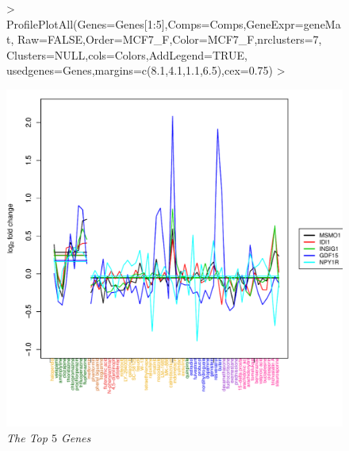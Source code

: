 \documentclass[a4paper]{article}
\begin{document}
\begin{figure}[H] 
\centering
\begin{Schunk}
\begin{Sinput}
> ProfilePlotAll(Genes=Genes[1:5],Comps=Comps,GeneExpr=geneMat,
                Raw=FALSE,Order=MCF7_F,Color=MCF7_F,nrclusters=7,
                Clusters=NULL,cols=Colors,AddLegend=TRUE,
                usedgenes=Genes,margins=c(8.1,4.1,1.1,6.5),cex=0.75)
> 
\end{Sinput}
\end{Schunk}
\includegraphics{IntClustVignette-ProfilePlot}
\vspace{-1.0cm}
\caption{{\it The Top $5$ Genes}\label{MCF7_Weights}}
\end{figure}
\newpage
\end{document}
